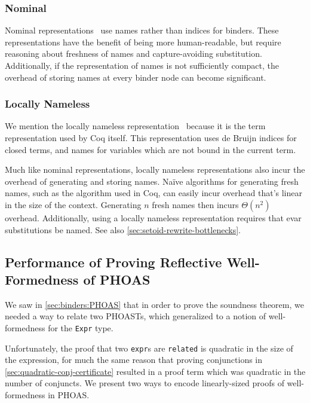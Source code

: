 \subsubsection{Nominal} \label{sec:binders:nominal}
Nominal representations~\cite{Nominal2003Pitts} use names rather than indices for binders.
These representations have the benefit of being more human-readable, but require reasoning about freshness of names and capture-avoiding substitution.
Additionally, if the representation of names is not sufficiently compact, the overhead of storing names at every binder node can become significant.

\subsubsection{Locally Nameless} \label{sec:binders:locally-nameless}
We mention the locally nameless representation~\cite{Locally2012Chargueraud,locally2007Leroy} because it is the term representation used by Coq itself.
This representation uses de Bruijn indices for closed terms, and names for variables which are not bound in the current term.

Much like nominal representations, locally nameless representations also incur the overhead of generating and storing names.
Naïve algorithms for generating fresh names, such as the algorithm used in Coq, can easily incur overhead that's linear in the size of the context.
Generating $n$ fresh names then incurs $\mathcal \Theta(n^2)$ overhead.
Additionally, using a locally nameless representation requires that evar substitutions be named.
See also \autoref{sec:setoid-rewrite-bottlenecks}.

\subsection{Performance of Proving Reflective Well-Formedness of PHOAS} \label{sec:wf:perf}

We saw in \autoref{sec:binders:PHOAS} that in order to prove the soundness theorem, we needed a way to relate two PHOASTs, which generalized to a notion of well-formedness for the \texttt{Expr} type.

Unfortunately, the proof that two \texttt{expr}s are \texttt{related} is quadratic in the size of the expression, for much the same reason that proving conjunctions in \autoref{sec:quadratic-conj-certificate} resulted in a proof term which was quadratic in the number of conjuncts.
We present two ways to encode linearly-sized proofs of well-formedness in PHOAS.

